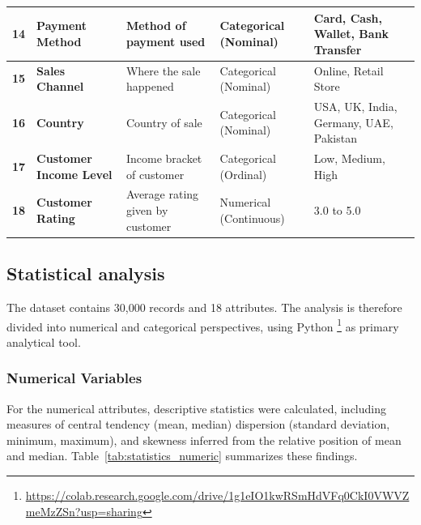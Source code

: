 \documentclass[12pt]{article}
\begin{document}
\begin{longtable}{|>{\bfseries}p{0.5cm}|>{\bfseries}p{2.0cm}|p{4cm}|p{3cm}|p{4cm}|}
\hline
14 & Payment Method & Method of payment used & Categorical (Nominal) & Card, Cash, Wallet, Bank Transfer \\
\hline
15 & Sales Channel & Where the sale happened & Categorical (Nominal) & Online, Retail Store \\
\hline
16 & Country & Country of sale & Categorical (Nominal) & USA, UK, India, Germany, UAE, Pakistan \\
\hline
17 & Customer Income Level & Income bracket of customer & Categorical (Ordinal) & Low, Medium, High \\
\hline
18 & Customer Rating & Average rating given by customer & Numerical (Continuous) & 3.0 to 5.0 \\
\hline

\end{longtable}


\subsection{Statistical analysis}

The dataset contains 30,000 records and 18 attributes. The analysis is therefore divided into numerical and categorical perspectives, using Python \footnote{\url{https://colab.research.google.com/drive/1g1eIO1kwRSmHdVFq0CkI0VWVZmeMzZSn?usp=sharing}} as primary analytical tool.


\subsubsection{Numerical Variables}

For the numerical attributes, descriptive statistics were calculated, including measures of central tendency (mean, median) dispersion (standard deviation, minimum, maximum), and skewness inferred from the relative position of mean and median. Table~\ref{tab:statistics_numeric} summarizes these findings.
\end{document}
